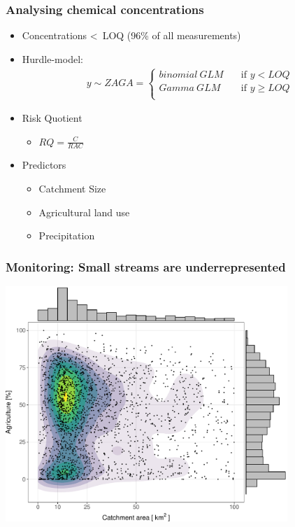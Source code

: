 \documentclass[
	10pt
	]{beamer}
\begin{document}
\begin{frame}
\frametitle{Analysing chemical concentrations}
	\begin{itemize}
		\pause
		\item Concentrations \textless~LOQ (96\% of all measurements)
		\pause
		\item Hurdle-model: 
			\begin{align*}
			y \sim ZAGA = 
			  \begin{cases}
			    binomial~GLM   & \quad  \text{if } y < LOQ \\
			    Gamma~GLM & \quad \text{if } y \ge LOQ \\
			  \end{cases}
			\end{align*}
		\pause
		\item Risk Quotient
			\begin{itemize}
				\item $RQ = \frac{C}{RAC}$
			\end{itemize}
		\pause
		\item Predictors
		    \begin{itemize}
				\item Catchment Size 
				\item Agricultural land use
				\item Precipitation
			\end{itemize}
	\end{itemize}
\end{frame}



\begin{frame}
\frametitle{Monitoring: Small streams are underrepresented}
	\includegraphics[width = 0.8\textwidth]{figs/distribution.pdf}
\end{frame}
\end{document}
